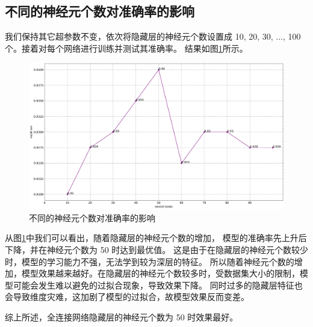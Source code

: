 \documentclass[supercite]{Experimental_Report}
\theoremstyle{definition}
\begin{document}
\subsection{不同的神经元个数对准确率的影响}
我们保持其它超参数不变，依次将隐藏层的神经元个数设置成 10, 20, 30, ..., 100 个。接着对每个网络进行训练并测试其准确率。
结果如图\ref{不同的神经元个数}所示。
\begin{figure}[H]
	\begin{center}
		\includegraphics[scale=0.35]{../images/不同的神经元个数.pdf}
		\caption{不同的神经元个数对准确率的影响}
		\label{不同的神经元个数}
	\end{center}
\end{figure}

从图\ref{不同的神经元个数}中我们可以看出，随着隐藏层的神经元个数的增加，
模型的准确率先上升后下降，并在神经元个数为 50 时达到最优值。
这是由于在隐藏层的神经元个数较少时，模型的学习能力不强，无法学到较为深层的特征。
所以随着神经元个数的增加，模型效果越来越好。在隐藏层的神经元个数较多时，受数据集大小的限制，模型可能会发生难以避免的过拟合现象，导致效果下降。
同时过多的隐藏层特征也会导致维度灾难，这加剧了模型的过拟合，故模型效果反而变差。

综上所述，全连接网络隐藏层的神经元个数为 50 时效果最好。
\end{document}
